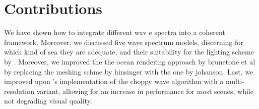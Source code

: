 
%
%
%

%





%
\section{Contributions}
\textcolor{changed}{
We have shown how to integrate different wav e spectra into a coherent
framework. Moreover, we discussed five wave spectrum models, discerning
for which kind of sea they are adequate, and their suitability for
the lighting scheme by \citet{article:oceanlighting,misc:oceanlightingfft,article:whitecaps}.
Moreover, we improved the
the ocean rendering approach by brunetone et al by replacing the
meshing schme by hinsinger with the one by johanson. Last, we improved
upon \citet{misc:oceanlightingfft}'s implementation of the choppy wave
algorithm with a multi-resolution variant, allowing for an increase
in performance for most scenes, while not degrading visual quality.
}
%
